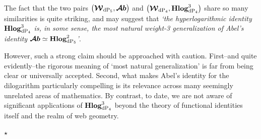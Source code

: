 \documentclass[11pt]{amsart}
\begin{document}
The fact that the two pairs $\big( 
\boldsymbol{\mathcal W}_{ {\rm dP}_5}, 
 \boldsymbol{\mathcal Ab}
\big)$ and $\big( 
\boldsymbol{\mathcal W}_{ {\rm dP}_4}, 
{\bf Hlog}^{3}_{ {\rm dP}_4}
\big)$ share so many similarities is quite striking, and may suggest that {\it `the hyperlogarithmic identity ${\bf Hlog}^{3}_{ {\rm dP}_4}$ is, in some sense, the most natural weight-3 generalization of Abel's identity $ \boldsymbol{\mathcal Ab}\simeq {\bf Hlog}^{2}_{ {\rm dP}_5}$'}. 

However, such a strong claim should be approached with caution. First--and quite evidently--the rigorous meaning of `most natural generalization' is far from being clear or universally accepted. Second, what makes Abel's identity for the dilogarithm particularly compelling is its relevance across many seemingly unrelated areas of mathematics. By contrast, to date, we are not aware of significant applications of ${\bf Hlog}^{3}_{ {\rm dP}_4}$  beyond the theory of functional identities itself and the realm of web geometry.
\begin{center}
\vspace{-0.3cm}
$\star$
\end{center}
\end{document}
